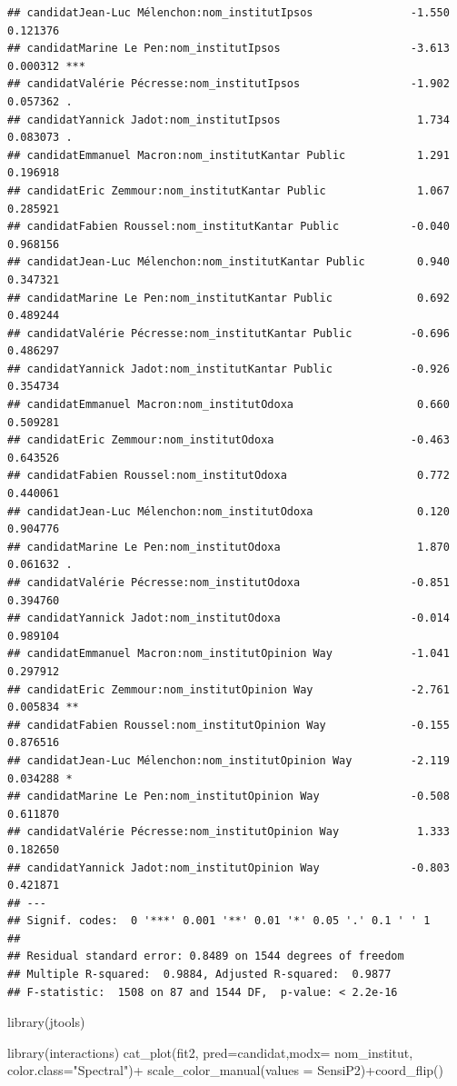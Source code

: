 \documentclass[
]{book}
\newenvironment{Shaded}{\begin{snugshade}}{\end{snugshade}}
\newcommand{\AttributeTok}[1]{\textcolor[rgb]{0.77,0.63,0.00}{#1}}
\newcommand{\FunctionTok}[1]{\textcolor[rgb]{0.00,0.00,0.00}{#1}}
\newcommand{\NormalTok}[1]{#1}
\newcommand{\SpecialCharTok}[1]{\textcolor[rgb]{0.00,0.00,0.00}{#1}}
\newcommand{\StringTok}[1]{\textcolor[rgb]{0.31,0.60,0.02}{#1}}
\begin{document}
\begin{verbatim}
## candidatJean-Luc Mélenchon:nom_institutIpsos               -1.550 0.121376    
## candidatMarine Le Pen:nom_institutIpsos                    -3.613 0.000312 ***
## candidatValérie Pécresse:nom_institutIpsos                 -1.902 0.057362 .  
## candidatYannick Jadot:nom_institutIpsos                     1.734 0.083073 .  
## candidatEmmanuel Macron:nom_institutKantar Public           1.291 0.196918    
## candidatEric Zemmour:nom_institutKantar Public              1.067 0.285921    
## candidatFabien Roussel:nom_institutKantar Public           -0.040 0.968156    
## candidatJean-Luc Mélenchon:nom_institutKantar Public        0.940 0.347321    
## candidatMarine Le Pen:nom_institutKantar Public             0.692 0.489244    
## candidatValérie Pécresse:nom_institutKantar Public         -0.696 0.486297    
## candidatYannick Jadot:nom_institutKantar Public            -0.926 0.354734    
## candidatEmmanuel Macron:nom_institutOdoxa                   0.660 0.509281    
## candidatEric Zemmour:nom_institutOdoxa                     -0.463 0.643526    
## candidatFabien Roussel:nom_institutOdoxa                    0.772 0.440061    
## candidatJean-Luc Mélenchon:nom_institutOdoxa                0.120 0.904776    
## candidatMarine Le Pen:nom_institutOdoxa                     1.870 0.061632 .  
## candidatValérie Pécresse:nom_institutOdoxa                 -0.851 0.394760    
## candidatYannick Jadot:nom_institutOdoxa                    -0.014 0.989104    
## candidatEmmanuel Macron:nom_institutOpinion Way            -1.041 0.297912    
## candidatEric Zemmour:nom_institutOpinion Way               -2.761 0.005834 ** 
## candidatFabien Roussel:nom_institutOpinion Way             -0.155 0.876516    
## candidatJean-Luc Mélenchon:nom_institutOpinion Way         -2.119 0.034288 *  
## candidatMarine Le Pen:nom_institutOpinion Way              -0.508 0.611870    
## candidatValérie Pécresse:nom_institutOpinion Way            1.333 0.182650    
## candidatYannick Jadot:nom_institutOpinion Way              -0.803 0.421871    
## ---
## Signif. codes:  0 '***' 0.001 '**' 0.01 '*' 0.05 '.' 0.1 ' ' 1
## 
## Residual standard error: 0.8489 on 1544 degrees of freedom
## Multiple R-squared:  0.9884, Adjusted R-squared:  0.9877 
## F-statistic:  1508 on 87 and 1544 DF,  p-value: < 2.2e-16
\end{verbatim}

\begin{Shaded}
\begin{Highlighting}[]
\FunctionTok{library}\NormalTok{(jtools)}

\FunctionTok{library}\NormalTok{(interactions)}
\FunctionTok{cat\_plot}\NormalTok{(fit2, }\AttributeTok{pred=}\NormalTok{candidat,}\AttributeTok{modx=}\NormalTok{ nom\_institut, }\AttributeTok{color.class=}\StringTok{"Spectral"}\NormalTok{)}\SpecialCharTok{+}
  \FunctionTok{scale\_color\_manual}\NormalTok{(}\AttributeTok{values =}\NormalTok{ SensiP2)}\SpecialCharTok{+}\FunctionTok{coord\_flip}\NormalTok{()}
\end{Highlighting}
\end{Shaded}
\end{document}
